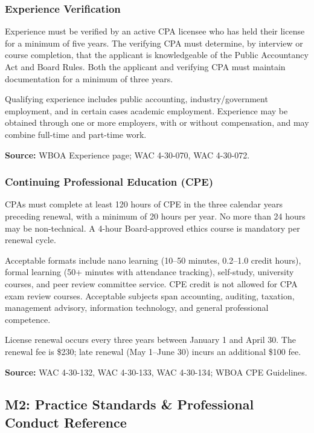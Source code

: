 \documentclass[11pt,letterpaper]{article}
\begin{document}
\subsubsection{Experience Verification}

Experience must be verified by an active CPA licensee who has held their license for a minimum of five years. The verifying CPA must determine, by interview or course completion, that the applicant is knowledgeable of the Public Accountancy Act and Board Rules. Both the applicant and verifying CPA must maintain documentation for a minimum of three years.

Qualifying experience includes public accounting, industry/government employment, and in certain cases academic employment. Experience may be obtained through one or more employers, with or without compensation, and may combine full-time and part-time work.

\textbf{Source:} WBOA Experience page; WAC 4-30-070, WAC 4-30-072.

\subsubsection{Continuing Professional Education (CPE)}

CPAs must complete at least 120 hours of CPE in the three calendar years preceding renewal, with a minimum of 20 hours per year. No more than 24 hours may be non-technical. A 4-hour Board-approved ethics course is mandatory per renewal cycle.

Acceptable formats include nano learning (10--50 minutes, 0.2--1.0 credit hours), formal learning (50+ minutes with attendance tracking), self-study, university courses, and peer review committee service. CPE credit is not allowed for CPA exam review courses. Acceptable subjects span accounting, auditing, taxation, management advisory, information technology, and general professional competence.

License renewal occurs every three years between January 1 and April 30. The renewal fee is \$230; late renewal (May 1--June 30) incurs an additional \$100 fee.

\textbf{Source:} WAC 4-30-132, WAC 4-30-133, WAC 4-30-134; WBOA CPE Guidelines.

\subsection{M2: Practice Standards \& Professional Conduct Reference}
\end{document}
